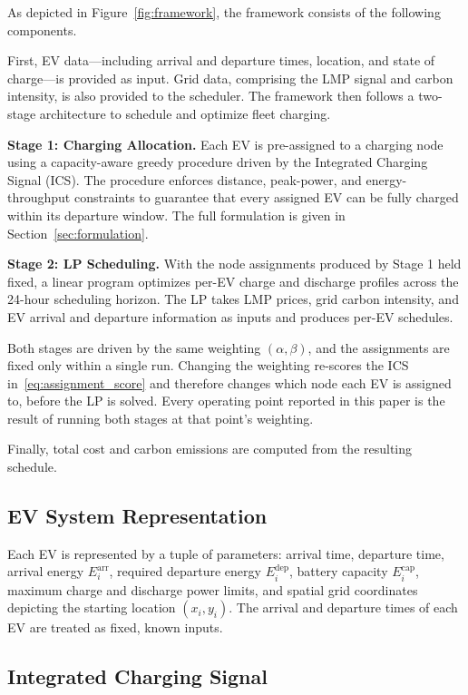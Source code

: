 \documentclass[sustainability,article,submit,moreauthors,pdftex]{Definitions/mdpi}
\begin{document}
As depicted in Figure~\ref{fig:framework}, the framework consists of the following components.

First, EV data---including arrival and departure times, location, and state of charge---is provided as input. Grid data, comprising the LMP signal and carbon intensity, is also provided to the scheduler. The framework then follows a two-stage architecture to schedule and optimize fleet charging.

\textbf{Stage 1: Charging Allocation.} Each EV is pre-assigned to a charging node using a capacity-aware greedy procedure driven by the Integrated Charging Signal (ICS). The procedure enforces distance, peak-power, and energy-throughput constraints to guarantee that every assigned EV can be fully charged within its departure window. The full formulation is given in Section~\ref{sec:formulation}.

\textbf{Stage 2: LP Scheduling.} With the node assignments produced by Stage 1 held fixed, a linear program optimizes per-EV charge and discharge profiles across the 24-hour scheduling horizon. The LP takes LMP prices, grid carbon intensity, and EV arrival and departure information as inputs and produces per-EV schedules.

Both stages are driven by the same weighting $(\alpha, \beta)$, and the assignments are fixed only within a single run. Changing the weighting re-scores the ICS in~\eqref{eq:assignment_score} and therefore changes which node each EV is assigned to, before the LP is solved. Every operating point reported in this paper is the result of running both stages at that point's weighting.

Finally, total cost and carbon emissions are computed from the resulting schedule.

\subsection{EV System Representation}

Each EV is represented by a tuple of parameters: arrival time, departure time, arrival energy $E_i^{\mathrm{arr}}$, required departure energy $E_i^{\mathrm{dep}}$, battery capacity $E_i^{\mathrm{cap}}$, maximum charge and discharge power limits, and spatial grid coordinates depicting the starting location $(x_i, y_i)$. The arrival and departure times of each EV are treated as fixed, known inputs.

\subsection{Integrated Charging Signal}
\end{document}

